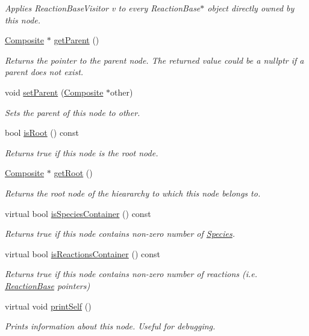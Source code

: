 \begin{DoxyCompactItemize}
\begin{DoxyCompactList}\small\item\em Applies Reaction\+Base\+Visitor v to every Reaction\+Base$\ast$ object directly owned by this node. \end{DoxyCompactList}\item 
\hyperlink{classComposite}{Composite} $\ast$ \hyperlink{classComponent_a4bb9041a7f3854f25f45060e81bb4e4e}{get\+Parent} ()
\begin{DoxyCompactList}\small\item\em Returns the pointer to the parent node. The returned value could be a nullptr if a parent does not exist. \end{DoxyCompactList}\item 
void \hyperlink{classComponent_a9d5b03697a653cda24d5688af1d105f8}{set\+Parent} (\hyperlink{classComposite}{Composite} $\ast$other)
\begin{DoxyCompactList}\small\item\em Sets the parent of this node to other. \end{DoxyCompactList}\item 
bool \hyperlink{classComponent_a4f0bed8144509d6565a30b548fac0fe7}{is\+Root} () const 
\begin{DoxyCompactList}\small\item\em Returns true if this node is the root node. \end{DoxyCompactList}\item 
\hyperlink{classComposite}{Composite} $\ast$ \hyperlink{classComponent_abcb3746cb8b4afcecf437dce40c0c772}{get\+Root} ()
\begin{DoxyCompactList}\small\item\em Returns the root node of the hieararchy to which this node belongs to. \end{DoxyCompactList}\item 
virtual bool \hyperlink{classComponent_a0daf865ff32aff9e68316c65b681cbf9}{is\+Species\+Container} () const 
\begin{DoxyCompactList}\small\item\em Returns true if this node contains non-\/zero number of \hyperlink{classSpecies}{Species}. \end{DoxyCompactList}\item 
virtual bool \hyperlink{classComponent_a506e080028078ef9a753d854c60904a3}{is\+Reactions\+Container} () const 
\begin{DoxyCompactList}\small\item\em Returns true if this node contains non-\/zero number of reactions (i.\+e. \hyperlink{classReactionBase}{Reaction\+Base} pointers) \end{DoxyCompactList}\item 
virtual void \hyperlink{classComponent_a871fbdc783ea600ed667dd37eb8adf1e}{print\+Self} ()
\begin{DoxyCompactList}\small\item\em Prints information about this node. Useful for debugging. \end{DoxyCompactList}\end{DoxyCompactItemize}
